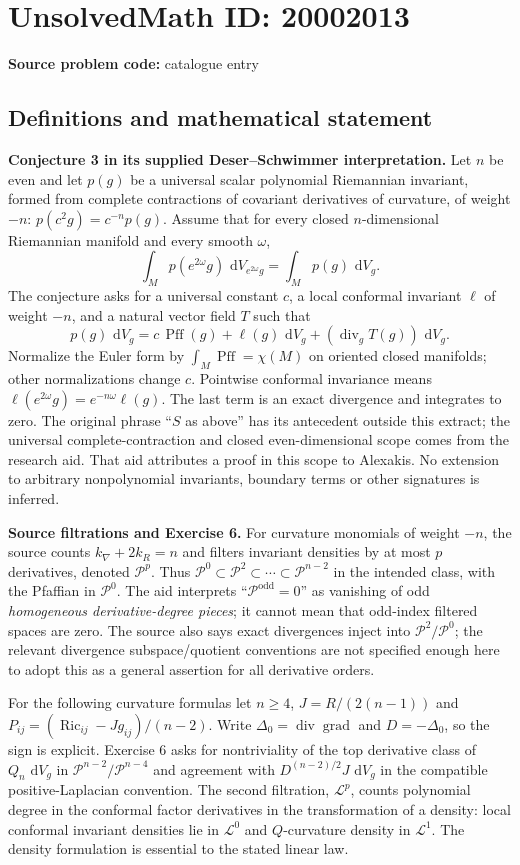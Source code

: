 \documentclass[11pt]{article}
\newcommand{\dd}{\,\mathrm{d}}
\begin{document}
\section*{UnsolvedMath ID: 20002013}
\textbf{Source problem code:} catalogue entry
\subsection{Definitions and mathematical statement}
\textbf{Conjecture 3 in its supplied Deser--Schwimmer interpretation.} Let $n$ be even and let $p(g)$ be a universal scalar polynomial Riemannian invariant, formed from complete contractions of covariant derivatives of curvature, of weight $-n$: $p(c^2g)=c^{-n}p(g)$. Assume that for every closed $n$-dimensional Riemannian manifold and every smooth $\omega$,
\[
 \int_Mp(e^{2\omega}g)\,\dd V_{e^{2\omega}g}
   =\int_Mp(g)\,\dd V_g.
\]
The conjecture asks for a universal constant $c$, a local conformal invariant $\ell$ of weight $-n$, and a natural vector field $T$ such that
\[
 p(g)\,\dd V_g=c\,\operatorname{Pff}(g)
                    +\ell(g)\,\dd V_g
                    +(\operatorname{div}_gT(g))\,\dd V_g.
\]
Normalize the Euler form by $\int_M\operatorname{Pff}=\chi(M)$ on oriented closed manifolds; other normalizations change $c$. Pointwise conformal invariance means $\ell(e^{2\omega}g)=e^{-n\omega}\ell(g)$. The last term is an exact divergence and integrates to zero. The original phrase ``$S$ as above'' has its antecedent outside this extract; the universal complete-contraction and closed even-dimensional scope comes from the research aid. That aid attributes a proof in this scope to Alexakis. No extension to arbitrary nonpolynomial invariants, boundary terms or other signatures is inferred.

\textbf{Source filtrations and Exercise 6.} For curvature monomials of weight $-n$, the source counts $k_\nabla+2k_R=n$ and filters invariant densities by at most $p$ derivatives, denoted $\mathcal P^p$. Thus $\mathcal P^0\subset\mathcal P^2\subset\cdots\subset\mathcal P^{n-2}$ in the intended class, with the Pfaffian in $\mathcal P^0$. The aid interprets ``$\mathcal P^{\mathrm{odd}}=0$'' as vanishing of odd \emph{homogeneous derivative-degree pieces}; it cannot mean that odd-index filtered spaces are zero. The source also says exact divergences inject into $\mathcal P^2/\mathcal P^0$; the relevant divergence subspace/quotient conventions are not specified enough here to adopt this as a general assertion for all derivative orders.

For the following curvature formulas let $n\ge4$, $J=R/(2(n-1))$ and $P_{ij}=(\operatorname{Ric}_{ij}-Jg_{ij})/(n-2)$. Write $\Delta_0=\operatorname{div}\operatorname{grad}$ and $D=-\Delta_0$, so the sign is explicit. Exercise 6 asks for nontriviality of the top derivative class of $Q_n\,\dd V_g$ in $\mathcal P^{n-2}/\mathcal P^{n-4}$ and agreement with $D^{(n-2)/2}J\,\dd V_g$ in the compatible positive-Laplacian convention. The second filtration, $\mathcal L^p$, counts polynomial degree in the conformal factor derivatives in the transformation of a density: local conformal invariant densities lie in $\mathcal L^0$ and $Q$-curvature density in $\mathcal L^1$. The density formulation is essential to the stated linear law.
\end{document}
